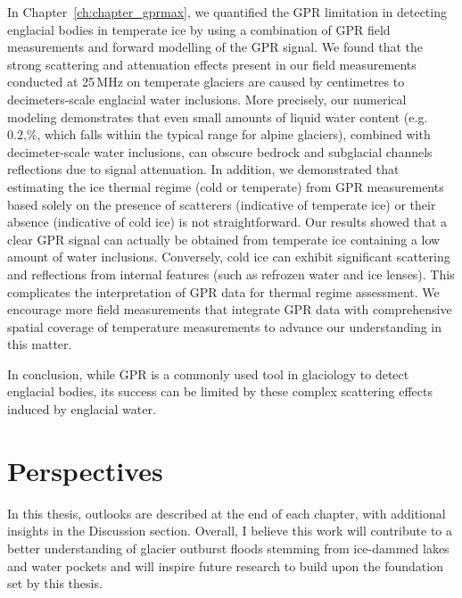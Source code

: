 In Chapter~\ref{ch:chapter_gprmax}, we quantified the GPR limitation in detecting englacial bodies in temperate ice by using a combination of GPR field measurements and forward modelling of the GPR signal. We found that the strong scattering and attenuation effects present in our field measurements conducted at 25\,MHz on temperate glaciers are caused by centimetres to decimeters-scale englacial water inclusions. More precisely, our numerical modeling demonstrates that even small amounts of liquid water content (e.g. 0.2,\%, which falls within the typical range for alpine glaciers), combined with decimeter-scale water inclusions, can obscure bedrock and subglacial channels reflections due to signal attenuation. In addition, we demonstrated that estimating the ice thermal regime (cold or temperate) from GPR measurements based solely on the presence of scatterers (indicative of temperate ice) or their absence (indicative of cold ice) is not straightforward. Our results showed that a clear GPR signal can actually be obtained from temperate ice containing a low amount of water inclusions. Conversely, cold ice can exhibit significant scattering and reflections from internal features (such as refrozen water and ice lenses). This complicates the interpretation of GPR data for thermal regime assessment. We encourage more field measurements that integrate GPR data with comprehensive spatial coverage of temperature measurements to advance our understanding in this matter.
%

In conclusion, while GPR is a commonly used tool in glaciology to detect englacial bodies, its success can be limited by these complex scattering effects induced by englacial water. 

\section{Perspectives}

In this thesis, outlooks are described at the end of each chapter, with additional insights in the Discussion section. Overall, I believe this work will contribute to a better understanding of glacier outburst floods stemming from ice-dammed lakes and water pockets and will inspire future research to build upon the foundation set by this thesis.



